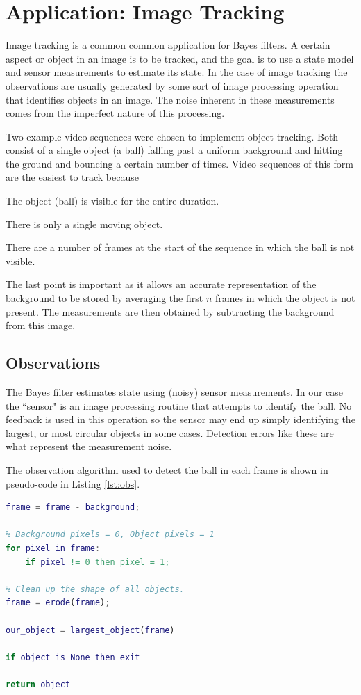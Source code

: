 \section{Application: Image Tracking}
Image tracking is a common common application for Bayes filters. A certain aspect or
object in an image is to be tracked, and the goal is to use a state
model and sensor measurements to estimate its state. In the case of image
tracking the observations are usually generated by some sort of image processing
operation that identifies objects in an image. The noise inherent in these measurements
comes from the imperfect nature of this processing.

Two example video sequences were chosen to implement object tracking. Both consist
of a single object (a ball) falling past a uniform background and hitting the ground
and bouncing a certain number of times. Video sequences of this form are the easiest
to track because
\begin{compactitem}
\item The object (ball) is visible for the entire duration.
\item There is only a single moving object.
\item There are a number of frames at the start of the sequence in which the
ball is not visible.
\end{compactitem}
The last point is important as it allows an accurate representation of the background
to be stored by averaging the first $n$ frames in which the object is not present.
The measurements are then obtained by subtracting the background from this image.

\subsection{Observations}
The Bayes filter estimates state using (noisy) sensor measurements. In our case
the ``sensor" is an image processing routine that attempts to identify the ball.
No feedback is used in this operation so the sensor may end up simply identifying
the largest, or most circular objects in some cases. Detection errors like these
are what represent the measurement noise.

The observation algorithm used to detect the ball in each frame is shown in
pseudo-code in Listing \ref{lst:obs}.

\begin{lstlisting}[language=Matlab, label=lst:obs,
caption=Implementation of observation routine.]
% Subtract background from frame
frame = frame - background;

% Background pixels = 0, Object pixels = 1
for pixel in frame:
    if pixel != 0 then pixel = 1;

% Clean up the shape of all objects.
frame = erode(frame);

our_object = largest_object(frame)

if object is None then exit

return object
\end{lstlisting}

